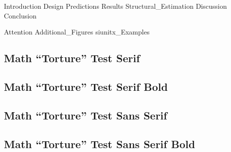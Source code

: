 \documentclass[a4paper, 10pt]{article}
\begin{document}

 \frenchspacing


{Introduction}
{Design}
{Predictions}
{Results}
{Structural_Estimation}
{Discussion}
{Conclusion}

\clearpage

\begin{appendices}
	\label{sec:appendix}
	\FloatBarrier
	{Attention}
	\FloatBarrier
	\newpage
	{Additional_Figures}
	\FloatBarrier
	{siunitx_Examples}
	\FloatBarrier
	\newpage
	{%
		\setlength{\parindent}{0cm}

		

		\newpage
		\renewcommand{\showfamily}{{\color{magenta}%
			Serif%
		}}
		{\rmfamily\mdseries%
		 \subsection{Math ``Torture'' Test \showfamily}
	 	}

		\newpage
		\renewcommand{\showfamily}{{\color{magenta}%
			Serif Bold%
		}}
		{\rmfamily\bfseries%
		 \subsection{Math ``Torture'' Test \showfamily}
		}

		\newpage
		\renewcommand{\showfamily}{{\color{magenta}%
			Sans Serif%
		}}
		{\sffamily\mdseries%
		 \subsection{Math ``Torture'' Test \showfamily}
		}

		\newpage
		\renewcommand{\showfamily}{{\color{magenta}%
			Sans Serif Bold%
		}}
		{\sffamily\bfseries%
		 \subsection{Math ``Torture'' Test \showfamily}
		}%
	}
\end{appendices}
\end{document}
